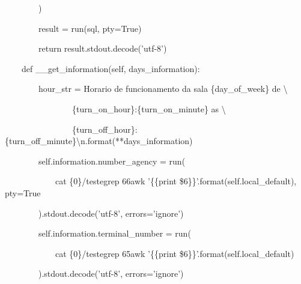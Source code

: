             {\ttfamily\color[rgb]{0.10980392,0.10980392,0.10980392}
            \ \ \ \ \ \ \ \ )}


    \bigskip

{\ttfamily\color[rgb]{0.10980392,0.10980392,0.10980392}
    \ \ \ \ \ \ \ \ result = run(sql, pty=True)}

{\ttfamily\color[rgb]{0.10980392,0.10980392,0.10980392}
    \ \ \ \ \ \ \ \ return result.stdout.decode('utf-8')}


    \bigskip

{\ttfamily\color[rgb]{0.10980392,0.10980392,0.10980392}
    \ \ \ \ def \_\_get\_information(self, days\_information):}

{\ttfamily\color[rgb]{0.10980392,0.10980392,0.10980392}
    \ \ \ \ \ \ \ \ hour\_str = {\textquotedbl}Horario de funcionamento da sala \{day\_of\_week\} de {\textbackslash}}

{\ttfamily\color[rgb]{0.10980392,0.10980392,0.10980392}
    \ \ \ \ \ \ \ \ \ \ \ \ \ \ \ \ \{turn\_on\_hour\}:\{turn\_on\_minute\} as {\textbackslash}}

{\ttfamily\color[rgb]{0.10980392,0.10980392,0.10980392}
    \ \ \ \ \ \ \ \ \ \ \ \ \ \ \ \ \{turn\_off\_hour\}:\{turn\_off\_minute\}{\textbackslash}n{\textquotedbl}.format(**days\_information)}


    \bigskip

{\ttfamily\color[rgb]{0.10980392,0.10980392,0.10980392}
    \ \ \ \ \ \ \ \ self.information.number\_agency = run(}

            {\ttfamily\color[rgb]{0.10980392,0.10980392,0.10980392}
            \ \ \ \ \ \ \ \ \ \ \ \ {\textquotedbl}cat \{0\}/teste{\textbar}grep 66{\textbar}awk '\{\{print
            \$6\}\}'{\textquotedbl}.format(self.local\_default), pty=True}

            {\ttfamily\color[rgb]{0.10980392,0.10980392,0.10980392}
            \ \ \ \ \ \ \ \ ).stdout.decode('utf-8', errors='ignore')}


    \bigskip

{\ttfamily\color[rgb]{0.10980392,0.10980392,0.10980392}
    \ \ \ \ \ \ \ \ self.information.terminal\_number = run(}

            {\ttfamily\color[rgb]{0.10980392,0.10980392,0.10980392}
            \ \ \ \ \ \ \ \ \ \ \ \ {\textquotedbl}cat \{0\}/teste{\textbar}grep 65{\textbar}awk '\{\{print
            \$6\}\}'{\textquotedbl}.format(self.local\_default)}

            {\ttfamily\color[rgb]{0.10980392,0.10980392,0.10980392}
            \ \ \ \ \ \ \ \ ).stdout.decode('utf-8', errors='ignore')}


